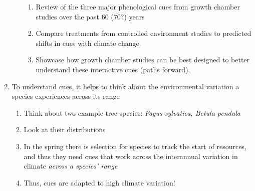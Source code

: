 \documentclass[11pt,letterpaper]{article}
\begin{document}
\begin{enumerate}
\begin{enumerate}
\begin{enumerate}
\item Review of the three major phenological cues from growth chamber studies over the past 60 (70?) years
\item Compare treatments from controlled environment studies to predicted shifts in cues with climate change.  
\item Showcase how growth chamber studies can be best designed to better understand these interactive cues (paths forward). 
\end{enumerate}
\end{enumerate}
\item To understand cues, it helps to think about the environmental variation a species experiences across its range %
\begin{enumerate}
\item Think about two example tree species: \emph{Fagus sylvatica, Betula pendula}
\item Look at their distributions
\item In the spring there is selection for species to track the start of resources, and thus they need cues that work across the interannual variation in climate \emph{across a species' range} %
\item Thus, cues are adapted to high climate variation! 


\end{enumerate}
\end{enumerate}
\end{document}
